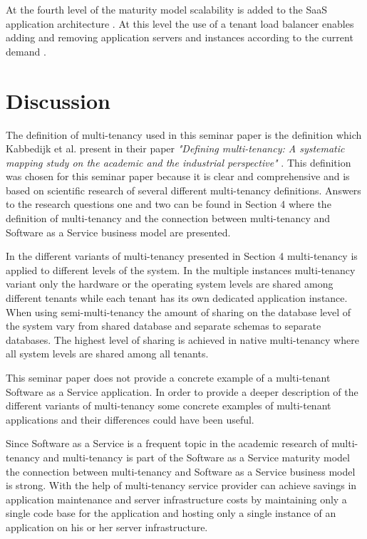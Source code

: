 \documentclass[conference]{sasmoota2017}
\begin{document}
At the fourth level of the maturity model scalability is added to the SaaS application architecture \cite{Carraro:2006:ArchitectureLongTail}. At this level the use of a tenant load balancer enables adding and removing application servers and instances according to the current demand \cite{Carraro:2006:ArchitectureLongTail}.



\section{Discussion}

The definition of multi-tenancy used in this seminar paper is the definition which Kabbedijk et al. present in their paper \textit{"Defining multi-tenancy: A systematic mapping study on the academic and the industrial perspective"} \cite{Kabbedijk2015:Defining}. This definition was chosen for this seminar paper because it is clear and comprehensive and is based on scientific research of several different multi-tenancy definitions. Answers to the research questions one and two can be found in Section 4 where the definition of multi-tenancy and the connection between multi-tenancy and Software as a Service business model are presented. 

In the different variants of multi-tenancy presented in Section 4 multi-tenancy is applied to different levels of the system. In the multiple instances multi-tenancy variant only the hardware or the operating system levels are shared among different tenants while each tenant has its own dedicated application instance. When using semi-multi-tenancy the amount of sharing on the database level of the system vary from shared database and separate schemas to separate databases. The highest level of sharing is achieved in native multi-tenancy where all system levels are shared among all tenants. 

This seminar paper does not provide a concrete example of a multi-tenant Software as a Service application. In order to provide a deeper description of the different variants of multi-tenancy some concrete examples of multi-tenant applications and their differences could have been useful. 

Since Software as a Service is a frequent topic in the academic research of multi-tenancy and multi-tenancy is part of the Software as a Service maturity model the connection between multi-tenancy and Software as a Service business model is strong. With the help of multi-tenancy service provider can achieve savings in application maintenance and server infrastructure costs by maintaining only a single code base for the application and hosting only a single instance of an application on his or her server infrastructure. 
\end{document}
